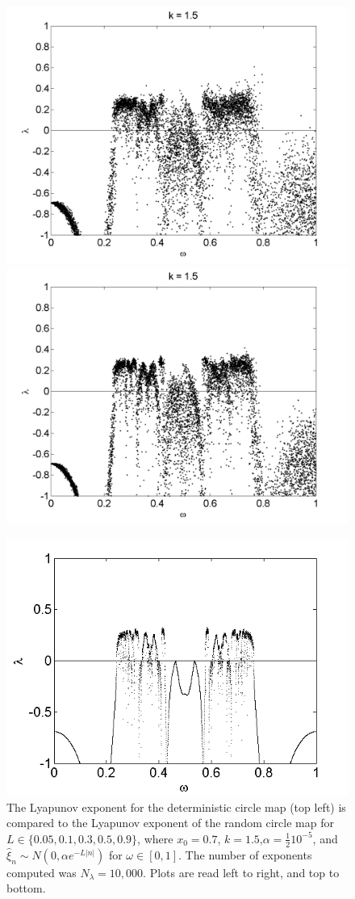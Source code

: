 \begin{figure}[!h]
\includegraphics[width=.5\textwidth]{figs/rcirc_n_lyap_L_05_w.png}\hfill
\includegraphics[width=.5\textwidth]{figs/rcirc_n_lyap_L_09_w.png}\\
\end{figure}

\begin{figure}[!h]
\caption[Lyapunov exponent in the random circle map (normal distribution) compared to the
deterministic map, varying $\omega$, $\alpha = \frac{1}{2}10^{-5}$]{The Lyapunov exponent for the deterministic
  circle map (top left) is compared
  to the Lyapunov exponent of the random circle map for $L \in
  \{0.05,0.1,0.3,0.5,0.9\}$, where $x_0=0.7$, $k=1.5$,$\alpha =\frac{1}{2}10^{-5}$, and $\hat{\xi}_n\sim
  N(0,\alpha e^{-L|n|})$ for $\omega \in [0,1]$. The number of exponents computed was $N_\lambda=10,000$. Plots are read left to right, and top to bottom. }\label{fig:rcirclyap_n_ha}
\centering
\includegraphics[width=.5\textwidth]{figs/det_circ_lyap.png}\hfill
\end{figure}

